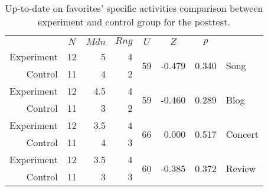 \begin{table}
  \begin{tabular}{rrrrrrrl}

    &
    \multicolumn{1}{c}{$N$} &
    \multicolumn{1}{c}{$Mdn$} &
    \multicolumn{1}{c}{$Rng$} &
    \multicolumn{1}{c}{$U$} &
    \multicolumn{1}{c}{$Z$} &
    \multicolumn{1}{c}{$p$} &
    \\

    \cmidrule(lr){2-7}

    Experiment &
    12 &
    5 &
    4 &
    \multirow{2}{*}{59} &
    \multirow{2}{*}{-0.479} &
    \multirow{2}{*}{0.340} &
    \multirow{2}{*}{Song}\\

    Control &
    11 &
    4 &
    2 &
    &
    &
    \\

    \cmidrule(lr){2-7}

    Experiment &
    12 &
    4.5 &
    4 &
    \multirow{2}{*}{59} &
    \multirow{2}{*}{-0.460} &
    \multirow{2}{*}{0.289} &
    \multirow{2}{*}{Blog}\\

    Control &
    11 &
    3 &
    2 &
    &
    &
    \\

    \cmidrule(lr){2-7}

    Experiment &
    12 &
    3.5 &
    4 &
    \multirow{2}{*}{66} &
    \multirow{2}{*}{0.000} &
    \multirow{2}{*}{0.517} &
    \multirow{2}{*}{Concert}\\

    Control &
    11 &
    4 &
    3 &
    &
    &
    \\

    \cmidrule(lr){2-7}

    Experiment &
    12 &
    3.5 &
    4 &
    \multirow{2}{*}{60} &
    \multirow{2}{*}{-0.385} &
    \multirow{2}{*}{0.372} &
    \multirow{2}{*}{Review}\\

    Control &
    11 &
    3 &
    3 &
    &
    &
    \\

  \end{tabular}
  \caption[Up-to-date on Favorites' Specific Activities, Between Groups]{%
    Up-to-date on favorites' specific activities comparison between
    experiment and control group for the posttest.
  }
  \label{table:uptodate.favorite.specific.activities.between}
\end{table}

